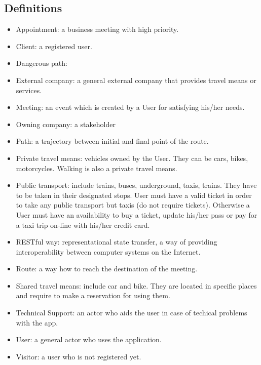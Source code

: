 \documentclass[a4paper,leqno]{book}
\begin{document}
\subsection{Definitions}
\begin{itemize}
	\item Appointment: a business meeting with high priority.
	\item Client: a registered user.
	\item Dangerous path: 
	\item External company: a general external company that provides travel means or services.
	\item Meeting: an event which is created by a User for satisfying his/her needs.
	\item Owning company: a stakeholder
	\item Path: a trajectory between initial and final point of the route.
	\item Private travel means: vehicles owned by the User. They can be cars, bikes, motorcycles. Walking is also a private travel means.
	\item Public transport: include trains, buses, underground, taxis, trains. They have to be taken in their designated stops. User must have a valid ticket in order to take any public transport but taxis (do not require tickets). Otherwise a User must have an availability to buy a ticket, update his/her pass or pay for a taxi trip on-line with his/her credit card.
	\item RESTful way:  representational state transfer, a way of providing interoperability between computer systems on the Internet.
	\item Route: a way how to reach the destination of the meeting.
	\item Shared travel means: include car and bike. They are located in specific places and require to make a reservation for using them.
	\item Technical Support: an actor who aids the user in case of techical problems with the app.
	\item User: a general actor who uses the application.
	\item Visitor: a user who is not registered yet.
\end{itemize}
\end{document}
